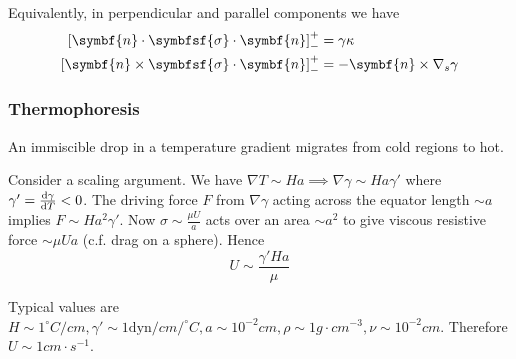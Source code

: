 \documentclass{jknotes}
\begin{document}
Equivalently, in perpendicular and parallel components we have
\begin{align}
	\left[ \symbf{n} \cdot \symbfsf{\sigma} \cdot \symbf{n}\right]^+_- &= \gamma
	\kappa \\
	\left[ \symbf{n} \times \symbfsf{\sigma} \cdot \symbf{n}\right]^+_- &= -\symbf{n}
	\times \nabla_s \gamma
\end{align}

\subsubsection{Thermophoresis}
An immiscible drop in a temperature gradient migrates from cold regions to
hot.

\begin{center}
\end{center}

Consider a scaling argument.  We have $\nabla T \sim H a \implies \nabla
\gamma \sim H a \gamma'$ where $\gamma' = \frac{\diffd \gamma}{\diffd T} < 0$.
The driving force $F$ from $\nabla \gamma$ acting across the equator length
$\sim a$ implies $F \sim H a^2 \gamma'$. Now $\sigma \sim \frac{\mu U}{a}$
acts over an area $\sim a^2$ to give viscous resistive force $\sim \mu U a$ (c.f.
drag on a sphere). Hence
\begin{equation}
	U \sim \frac{\gamma' H a}{\mu}
\end{equation}

Typical values are $H \sim 1^{\circ} C/cm, \gamma' \sim 1
\text{dyn}/cm/^{\circ} C, a \sim 10^{-2} cm, \rho \sim 1 g \cdot cm^{-3}, \nu
\sim 10^{-2} cm$. Therefore $U \sim 1 cm\cdot s^{-1}$.
\end{document}
